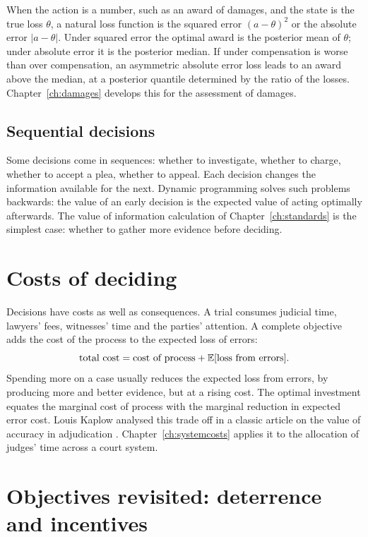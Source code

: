 When the action is a number, such as an award of damages, and the state is the true loss $\theta$, a natural loss function is the squared error $(a-\theta)^2$ or the absolute error $|a-\theta|$. Under squared error the optimal award is the posterior mean of $\theta$; under absolute error it is the posterior median. If under compensation is worse than over compensation, an asymmetric absolute error loss leads to an award above the median, at a posterior quantile determined by the ratio of the losses. Chapter~\ref{ch:damages} develops this for the assessment of damages.

\subsection{Sequential decisions}

Some decisions come in sequences: whether to investigate, whether to charge, whether to accept a plea, whether to appeal. Each decision changes the information available for the next. Dynamic programming solves such problems backwards: the value of an early decision is the expected value of acting optimally afterwards. The value of information calculation of Chapter~\ref{ch:standards} is the simplest case: whether to gather more evidence before deciding.

\section{Costs of deciding}

Decisions have costs as well as consequences. A trial consumes judicial time, lawyers' fees, witnesses' time and the parties' attention. A complete objective adds the cost of the process to the expected loss of errors:
\begin{equation}
\text{total cost} = \text{cost of process} + \mathbb{E}[\text{loss from errors}].
\end{equation}
Spending more on a case usually reduces the expected loss from errors, by producing more and better evidence, but at a rising cost. The optimal investment equates the marginal cost of process with the marginal reduction in expected error cost. Louis Kaplow analysed this trade off in a classic article on the value of accuracy in adjudication \citep{kaplow1994}. Chapter~\ref{ch:systemcosts} applies it to the allocation of judges' time across a court system.

\section{Objectives revisited: deterrence and incentives}

